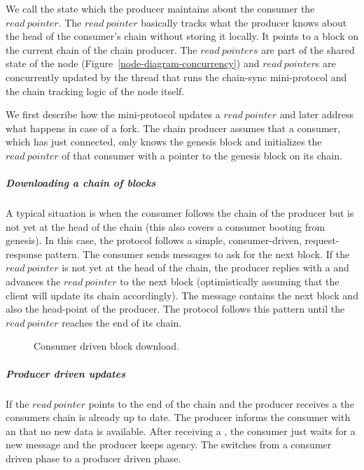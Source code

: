 \documentclass{report}
\theoremstyle{definition}{
  \newtheorem{lemma}{Lemma}[section] %
  \newtheorem{definition}[lemma]{Definition}
}
\theoremstyle{theorem}{
  \newtheorem{invariant}[lemma]{Invariant}
  \newtheorem{proofobligation}[lemma]{Proof Obligation}
}
\numberwithin{equation}{lemma}
\begin{document}
We call the state which the producer maintains about the consumer the $read~pointer$.
The $read~pointer$ basically tracks what the producer knows about the head of
the consumer's chain without storing it locally.
It points to a block on the current chain of the chain producer.
The $read~pointers$ are part of the shared state of the node (Figure~\ref{node-diagram-concurrency}) and
$read~pointer$s are concurrently updated by the thread that runs the chain-sync mini-protocol and the
chain tracking logic of the node itself.

We first describe how the mini-protocol updates a $read~pointer$ and later address what happens in case
of a fork.
The chain producer assumes that a consumer, which has just connected,
only knows the genesis block and initializes the $read~pointer$ of that consumer
with a pointer to the genesis block on its chain.

\subparagraph{Downloading a chain of blocks}
A typical situation is when the consumer follows the chain of the producer but is not yet at the head of the
chain (this also covers a consumer booting from genesis).
In this case, the protocol follows a simple, consumer-driven, request-response pattern.
The consumer sends \RequestNext{} messages to ask for the next block.
If the $read~pointer$ is not yet at the head of the chain,
the producer replies with a \RollForward{} and advances the $read~pointer$ to
the next block (optimistically assuming that the client will update its chain
accordingly).
The \RollForward{} message contains the next block and also the head-point of the producer.
The protocol follows this pattern until the $read~pointer$ reaches the end of its chain.

\begin{figure}[ht]
\begin{center}
\end{center}
\caption{Consumer driven block download.}
\label{read-pointer-consumer-driver}
\end{figure}

\subparagraph{Producer driven updates}
If the $read~pointer$ points to the end of the chain and the producer receives
a \RequestNext{}
the consumers chain is already up to date.
The producer informs the consumer with an \AwaitReply{} that no new data is available.
After receiving a \AwaitReply, the consumer just waits for a new message and the producer keeps agency.
The \AwaitReply{} switches from a consumer driven phase to a producer driven phase.
\end{document}
